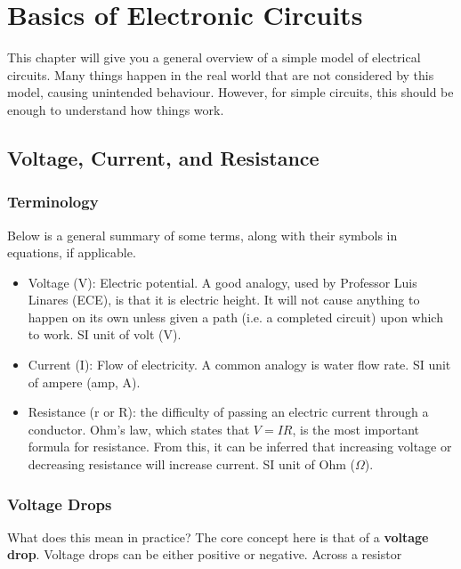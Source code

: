 \chapter{Basics of Electronic Circuits}

This chapter will give you a general overview of a simple model of electrical circuits. Many things happen in the real world that are not considered by this model, causing unintended behaviour. However, for simple circuits, this should be enough to understand how things work.
\section{Voltage, Current, and Resistance}
\subsection{Terminology}
Below is a general summary of some terms, along with their symbols in equations, if applicable.
\begin{itemize}
	\item Voltage (V): Electric potential. A good analogy, used by Professor Luis Linares (ECE), is that it is electric height. It will not cause anything to happen on its own unless given a path (i.e. a completed circuit) upon which to work. SI unit of volt (V).
	\item Current (I): Flow of electricity. A common analogy is water flow rate. SI unit of ampere (amp, A).
	\item Resistance (r or R): the difficulty of passing an electric current through a conductor. Ohm's law, which states that $V=IR$, is the most important formula for resistance. From this, it can be inferred that increasing voltage or decreasing resistance will increase current. SI unit of Ohm ($\Omega$).
\end{itemize}

\subsection{Voltage Drops}
What does this mean in practice? The core concept here is that of a \textbf{voltage drop}. Voltage drops can be either positive or negative. Across a resistor